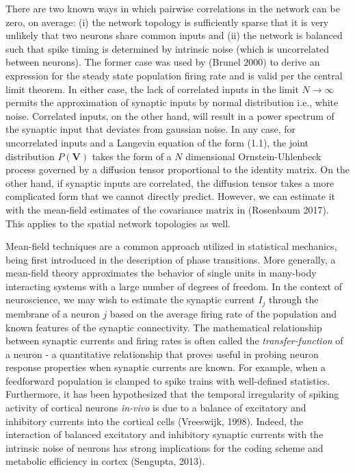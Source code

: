 \documentclass{ucetd}
\begin{document}
There are two known ways in which pairwise correlations in the network can be zero, on average: (i) the network topology is sufficiently sparse that it is very unlikely that two neurons share common inputs and (ii) the network is balanced such that spike timing is determined by intrinsic noise (which is uncorrelated between neurons). The former case was used by (Brunel 2000) to derive an expression for the steady state population firing rate and is valid per the central limit theorem. In either case, the lack of correlated inputs in the limit $N\rightarrow \infty$ permits the approximation of synaptic inputs by normal distribution i.e., white noise. Correlated inputs, on the other hand, will result in a power spectrum  of the synaptic input that deviates from gaussian noise. In any case, for uncorrelated inputs and a Langevin equation of the form (1.1), the joint distribution $P(\mathbf{V})$ takes the form of a $N$ dimensional Ornstein-Uhlenbeck process governed by a diffusion tensor proportional to the identity matrix. On the other hand, if synaptic inputs are correlated, the diffusion tensor takes a more complicated form that we cannot directly predict. However, we can estimate it with the mean-field estimates of the covariance matrix in (Rosenbaum 2017). This applies to the spatial network topologies as well.

Mean-field techniques are a common approach utilized in statistical mechanics, being first introduced in the description of phase transitions. More generally, a mean-field theory approximates the behavior of single units in many-body interacting systems with a large number of degrees of freedom. In the context of neuroscience, we may wish to estimate the synaptic current $I_{j}$ through the membrane of a neuron $j$ based on the average firing rate of the population and known features of the synaptic connectivity. The mathematical relationship between synaptic currents and firing rates is often called the \emph{transfer-function} of a neuron - a quantitative relationship that proves useful in probing neuron response properties when synaptic currents are known. For example, when a feedforward population is clamped to spike trains with well-defined statistics. Furthermore, it has been hypothesized that the temporal irregularity of spiking activity of cortical neurons \emph{in-vivo} is due to a balance of excitatory and inhibitory currents into the cortical cells (Vreeswijk, 1998). Indeed, the interaction of balanced excitatory and inhibitory synaptic currents with the intrinsic noise of neurons has strong implications for the coding scheme and metabolic efficiency in cortex (Sengupta, 2013). 
\end{document}
